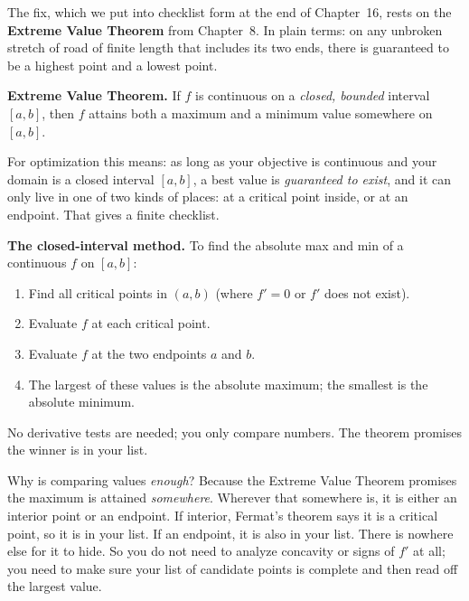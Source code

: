 The fix, which we put into checklist form at the end of Chapter~16, rests on the
\textbf{Extreme Value Theorem} from Chapter~8. In plain terms: on any unbroken
stretch of road of finite length that includes its two ends, there is guaranteed to
be a highest point and a lowest point.

\begin{focusbox}
\textbf{Extreme Value Theorem.} If $f$ is continuous on a \emph{closed, bounded}
interval $[a,b]$, then $f$ attains both a maximum and a minimum value somewhere on
$[a,b]$.
\end{focusbox}

For optimization this means: as long as your objective is continuous
and your domain is a closed interval $[a,b]$, a best value is \emph{guaranteed to
exist}, and it can only live in one of two kinds of places: at a critical point
inside, or at an endpoint. That gives a finite checklist.

\begin{focusbox}
\textbf{The closed-interval method.} To find the absolute max and min of a continuous
$f$ on $[a,b]$:
\begin{enumerate}
  \item Find all critical points in $(a,b)$ (where $f'=0$ or $f'$ does not exist).
  \item Evaluate $f$ at each critical point.
  \item Evaluate $f$ at the two endpoints $a$ and $b$.
  \item The largest of these values is the absolute maximum; the smallest is the
    absolute minimum.
\end{enumerate}
No derivative tests are needed; you only compare numbers. The theorem promises the
winner is in your list.
\end{focusbox}

\begin{whybox}
Why is comparing values \emph{enough}? Because the Extreme Value Theorem promises the
maximum is attained \emph{somewhere}. Wherever that somewhere is, it is either an
interior point or an endpoint. If interior, Fermat's theorem says it is a critical
point, so it is in your list. If an endpoint, it is also in your list. There is
nowhere else for it to hide. So you do not need to analyze concavity or signs of
$f'$ at all; you need to make sure your list of candidate points is complete and then
read off the largest value.
\end{whybox}

